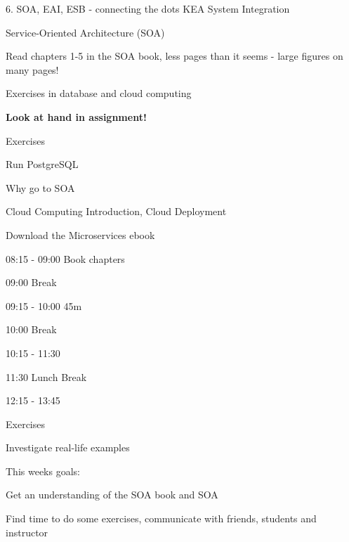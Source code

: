 \documentclass[Screen16to9,17pt]{foils}
\begin{document}
\mytitlepage
{6. SOA, EAI, ESB - connecting the dots }
{KEA System Integration}



\begin{list2}
\item Service-Oriented Architecture (SOA)
\item Read chapters 1-5 in the SOA book, less pages than it seems - large figures on many pages!
\item Exercises in database and cloud computing
\item {\bf Look at hand in assignment!}
\end{list2}

Exercises
\begin{list2}
\item Run PostgreSQL
\item Why go to SOA
\item Cloud Computing Introduction, Cloud Deployment
\item Download the Microservices ebook
\end{list2}



\begin{list2}
\item 08:15 - 09:00 Book chapters
\item
\item 09:00 Break
\item 09:15 - 10:00 45m
\item 10:00 Break
\item 10:15 - 11:30
\item 11:30 Lunch Break
\item 12:15 - 13:45
\item Exercises
\item Investigate real-life examples
\end{list2}





This weeks goals:
\begin{list2}
\item Get an understanding of the SOA book and SOA
\item Find time to do some exercises, communicate with friends, students and instructor
\end{list2}
\end{document}
